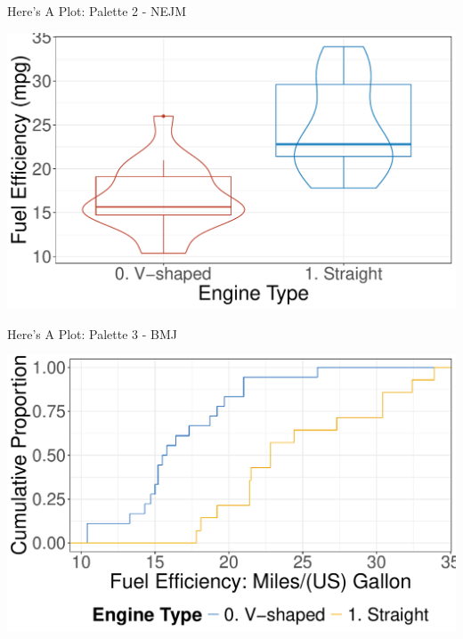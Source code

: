 \documentclass[
  11pt,
  ignorenonframetext,
]{beamer}
\begin{document}
\begin{frame}{Here's A Plot: Palette 2 - NEJM}
\label{heres-a-plot-palette-2---nejm}
\begin{center}
\includegraphics[width=\linewidth,height=0.8\textheight,keepaspectratio]{figures/mtcars-boxplot-mpg-by-vs-palette-2-1.pdf}
\end{center}
\end{frame}

\begin{frame}{Here's A Plot: Palette 3 - BMJ}
\label{heres-a-plot-palette-3---bmj}
\begin{center}
\includegraphics[width=\linewidth,height=0.8\textheight,keepaspectratio]{figures/mtcars-ecdf-mpg-by-vs-palette-3-1.pdf}
\end{center}
\end{frame}
\end{document}
